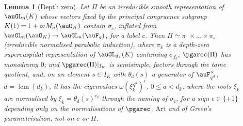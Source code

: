 \documentclass[10pt]{amsart}
\newtheorem{lemma}[theorem]{Lemma}
\theoremstyle{definition}
\theoremstyle{remark}
\begin{document}
\begin{lemma}[Depth zero]\label{pga:depth0}
Let $\Pi$ be an irreducible smooth representation of $\auGL_n(K)$ whose vectors fixed by the
principal congruence subgroup $K(1)=1+\varpi M_n(\auO_K)$ contain $\sigma_c$, inflated from
$\auGL_n(\auO_K)\to\auGL_n(\auF_q)$, for a label $c$. Then $\Pi\simeq\pi_1\times\dots\times\pi_s$
(irreducible normalised parabolic induction), where $\pi_k$ is a depth-zero supercuspidal
representation of $\auGL_{d_k}(K)$ containing $\sigma_{f_k}$; $\pgarec(\Pi)$ has monodromy $0$;
and $\pgarec(\Pi)|_{I_K}$ is semisimple, factors through the tame quotient, and, on an element
$s\in I_K$ with $\theta_d(s)$ a generator of $\auF_{q^d}^\times$, $d=\operatorname{lcm}(d_k)$, it
has the eigenvalues $\omega(\xi_k^{\,q^a})^{\epsilon}$, $0\le a<d_k$, where the roots $\xi_k$ are
normalised by $\xi_k=\theta_{d}(s)^{e_k}$ through the naming of $\sigma_c$, for a sign $\epsilon\in\{\pm1\}$ depending only on the normalisations of
$\pgarec$, $\mathrm{Art}$ and of Green's parametrisation, not on $c$ or $\Pi$.
\end{lemma}
\end{document}
